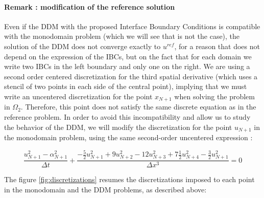 \paragraph{Remark : modification of the reference solution}

\indent  Even if the DDM with the proposed Interface Boundary Conditions is compatible with the monodomain problem (which we will see that is not the case), the solution of the DDM does not converge exactly to $u^{ref}$, for a reason that does not depend on the expression of the IBCs, but on the fact that for each domain we write two IBCs in the left boundary and only one on the right. We are using a second order centered discretization for the third spatial derivative (which uses a stencil of two points in each side of the central point), implying that we must write an uncentered discretization for the point $x_{N+1}$ when solving the problem in $\Omega_2$. Therefore, this point does not satisfy the same discrete equation as in the reference problem. In order to avoid this incompatibility and allow us to study the behavior of the DDM, we will modify the discretization for the point $u_{N+1}$ in the monodomain problem, using the same second-order uncentered expression :

\begin{equation*}
    \label{eq:uncenteredFDdiscretizationN}
    \frac{u_{N+1}^2 - \alpha_{N+1}^2}{\Delta t} + \frac{-\frac{5}{2}u_{N+1}^2 + 9u_{N+2}^2 - 12 u_{N+3}^2 + 7\frac{1}{2}u_{N+4}^2 -\frac{3}{2}u_{N+1}^2}{\Delta x ^3} = 0
\end{equation*}

\indent The figure \ref{fig:discretizations} resumes the discretizations imposed to each point in the monodomain and the DDM problems, as described above:

\indent 

